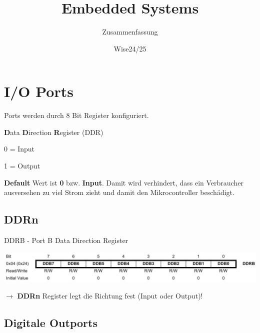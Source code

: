 \documentclass[11pt, a4paper]{scrartcl}
\title{Embedded Systems}
\author{Zusammenfassung}
\date{Wise24/25}
\begin{document}
\maketitle

\tableofcontents
\newpage



\raggedright
\section{I/O Ports}

Ports werden durch 8 Bit Register konfiguriert.

\textbf{D}ata \textbf{D}irection \textbf{R}egister (DDR) \\

\vspace{0.5em} 

0 = Input 

1 = Output

\vspace{1em} 

\textbf{Default} Wert ist \textbf{0} bzw. \textbf{Input}.
Damit wird verhindert, dass ein Verbraucher ausversehen zu viel Strom zieht und damit den Mikrocontroller beschädigt.  

\vspace{2em} 

\subsection{DDRn}

DDRB - Port B Data Direction Register

\includegraphics[width=1\textwidth]{01/01.png}

\vspace{2em} 

$\rightarrow$ \textbf{DDRn} Register legt die Richtung fest (Input oder Output)!

\newpage 




\subsection{Digitale Outports}
\end{document}

